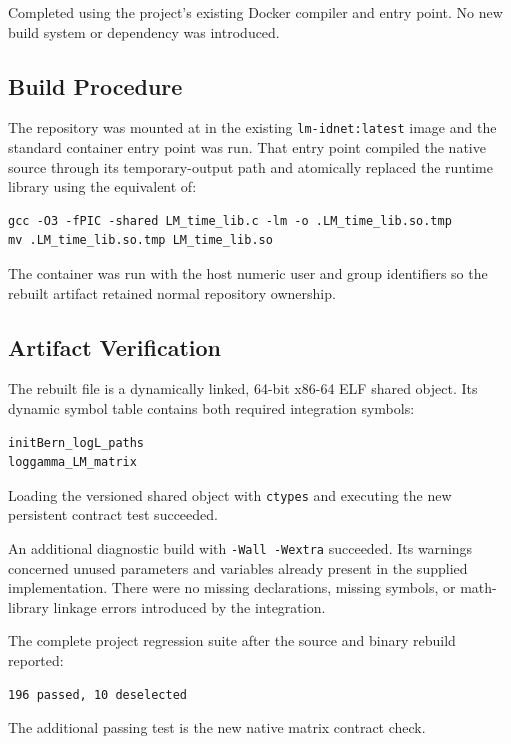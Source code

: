 \documentclass[11pt,a4paper]{article}
\begin{document}
Completed using the project's existing Docker compiler and entry point. No new
build system or dependency was introduced.

\subsection{Build Procedure}

The repository was mounted at  in the existing
\texttt{lm-idnet:latest} image and the standard container entry point was run.
That entry point compiled the native source through its temporary-output path
and atomically replaced the runtime library using the equivalent of:

\begin{verbatim}
gcc -O3 -fPIC -shared LM_time_lib.c -lm -o .LM_time_lib.so.tmp
mv .LM_time_lib.so.tmp LM_time_lib.so
\end{verbatim}

The container was run with the host numeric user and group identifiers so the
rebuilt artifact retained normal repository ownership.

\subsection{Artifact Verification}

The rebuilt file is a dynamically linked, 64-bit x86-64 ELF shared object. Its
dynamic symbol table contains both required integration symbols:

\begin{verbatim}
initBern_logL_paths
loggamma_LM_matrix
\end{verbatim}

Loading the versioned shared object with \texttt{ctypes} and executing the new
persistent contract test succeeded.

An additional diagnostic build with \texttt{-Wall -Wextra} succeeded. Its
warnings concerned unused parameters and variables already present in the
supplied implementation. There were no missing declarations, missing symbols,
or math-library linkage errors introduced by the integration.

The complete project regression suite after the source and binary rebuild
reported:

\begin{verbatim}
196 passed, 10 deselected
\end{verbatim}

The additional passing test is the new native matrix contract check.
\end{document}
